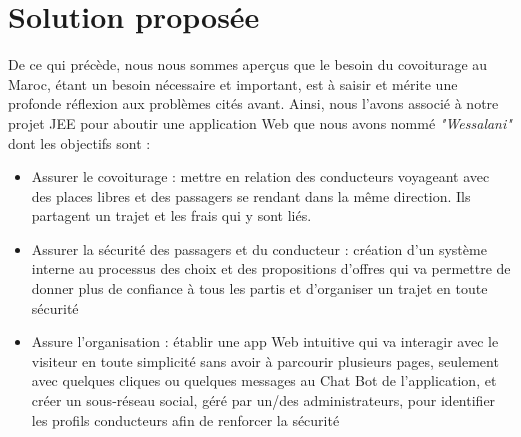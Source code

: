 \documentclass[a4paper]{report}
\begin{document}
\section{Solution proposée}

De ce qui précède, nous nous sommes aperçus que le besoin du covoiturage au Maroc, étant un besoin nécessaire et important, est à saisir et mérite une profonde réflexion aux problèmes cités avant. Ainsi, nous l'avons associé à notre projet JEE pour aboutir une application Web que nous avons nommé \textit{"Wessalani"} dont les objectifs sont :


\begin{itemize}
\item Assurer le covoiturage : mettre en relation des conducteurs voyageant avec des places libres et des passagers se rendant dans la même direction. Ils partagent un trajet et les frais qui y sont liés.
\item Assurer la sécurité des passagers et du conducteur : création d'un système interne au processus des choix et des propositions d'offres qui va permettre de donner plus de confiance à tous les partis et d'organiser un trajet en toute sécurité 
\item Assure l'organisation : établir une app Web intuitive qui va interagir avec le visiteur en toute simplicité sans avoir à parcourir plusieurs pages, seulement avec quelques cliques ou quelques messages au Chat Bot de l'application, et créer un sous-réseau social, géré par un/des administrateurs,
pour identifier les profils conducteurs afin de renforcer la sécurité 
\end{itemize}
\end{document}
